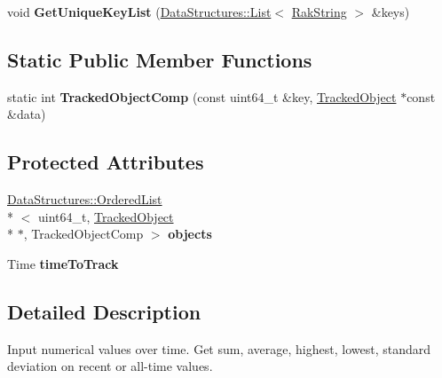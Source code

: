 \begin{DoxyCompactItemize}
\item 
\hypertarget{class_rak_net_1_1_statistics_history_a4bdae9905d79c7df767f3911f849d2fc}{void {\bfseries Get\-Unique\-Key\-List} (\hyperlink{class_data_structures_1_1_list}{Data\-Structures\-::\-List}$<$ \hyperlink{class_rak_net_1_1_rak_string}{Rak\-String} $>$ \&keys)}\label{class_rak_net_1_1_statistics_history_a4bdae9905d79c7df767f3911f849d2fc}

\end{DoxyCompactItemize}
\subsection*{Static Public Member Functions}
\begin{DoxyCompactItemize}
\item 
\hypertarget{class_rak_net_1_1_statistics_history_a83d254d700e6512181b74ad1cbf4aa3a}{static int {\bfseries Tracked\-Object\-Comp} (const uint64\-\_\-t \&key, \hyperlink{struct_rak_net_1_1_statistics_history_1_1_tracked_object}{Tracked\-Object} $\ast$const \&data)}\label{class_rak_net_1_1_statistics_history_a83d254d700e6512181b74ad1cbf4aa3a}

\end{DoxyCompactItemize}
\subsection*{Protected Attributes}
\begin{DoxyCompactItemize}
\item 
\hypertarget{class_rak_net_1_1_statistics_history_a648ca5b204dfecd66de40a39484c390c}{\hyperlink{class_data_structures_1_1_ordered_list}{Data\-Structures\-::\-Ordered\-List}\\*
$<$ uint64\-\_\-t, \hyperlink{struct_rak_net_1_1_statistics_history_1_1_tracked_object}{Tracked\-Object} \\*
$\ast$, Tracked\-Object\-Comp $>$ {\bfseries objects}}\label{class_rak_net_1_1_statistics_history_a648ca5b204dfecd66de40a39484c390c}

\item 
\hypertarget{class_rak_net_1_1_statistics_history_aed8ba33abe5a8ed4d6a08355702c0402}{Time {\bfseries time\-To\-Track}}\label{class_rak_net_1_1_statistics_history_aed8ba33abe5a8ed4d6a08355702c0402}

\end{DoxyCompactItemize}


\subsection{Detailed Description}
Input numerical values over time. Get sum, average, highest, lowest, standard deviation on recent or all-\/time values. 

